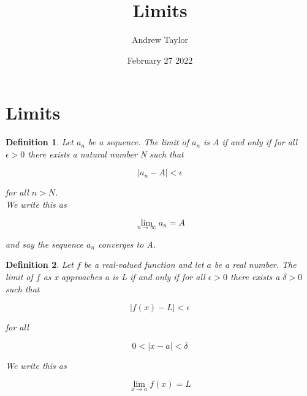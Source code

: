 \documentclass{article}
\title{Limits}
\author{Andrew Taylor}
\date{February 27 2022}
\newtheorem{definition}{Definition}
\begin{document}
\maketitle
\section{Limits}

\begin{definition}
Let $a_{n}$ be a sequence. The limit of $a_{n}$ is A if and only if for all $\epsilon > 0$ there exists a natural number N such that 

\begin{equation*}
|a_{n} - A| < \epsilon
\end{equation*}

for all $n > N$. \\

We write this as 

\begin{equation*}
\lim_{n \to \infty} a_{n} = A
\end{equation*}

and say the sequence $a_{n}$ converges to A.

\end{definition}

\begin{definition}
Let $f$ be a real-valued function and let $a$ be a real number. The limit of $f$ as x approaches a is L if and only if for all $\epsilon > 0$ there exists a $\delta > 0$ such that

\begin{equation*}
|f(x) - L| < \epsilon
\end{equation*}

for all 

\begin{equation*}
0 < |x - a| < \delta
\end{equation*}

We write this as 

\begin{equation*}
\lim_{x \to a} f(x) = L
\end{equation*}

\end{definition}
\end{document}
